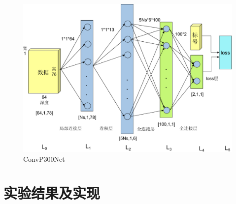 \begin{figure}[htb]
  \centering
  \includegraphics[scale=0.7]{Pictures/CNN/cnn_network-crop.pdf}
  \caption{ConvP300Net}\label{fig:p300cnn_network}
\end{figure}






\section{实验结果及实现}\label{sec:cnn_experiment}
